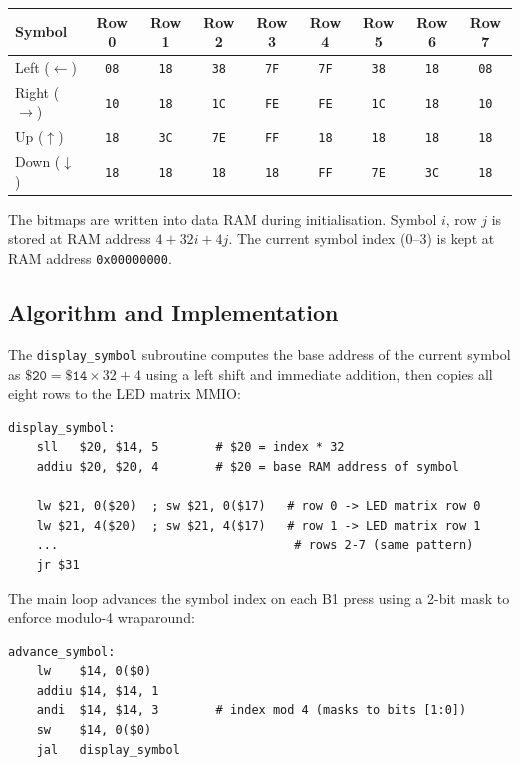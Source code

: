\documentclass[12pt,a4paper]{article}
\begin{document}
\begin{center}
\begin{tabular}{lcccccccc}
\toprule
Symbol & Row 0 & Row 1 & Row 2 & Row 3 & Row 4 & Row 5 & Row 6 & Row 7 \\
\midrule
Left  ($\leftarrow$)  & \texttt{08} & \texttt{18} & \texttt{38} & \texttt{7F} & \texttt{7F} & \texttt{38} & \texttt{18} & \texttt{08} \\
Right ($\rightarrow$) & \texttt{10} & \texttt{18} & \texttt{1C} & \texttt{FE} & \texttt{FE} & \texttt{1C} & \texttt{18} & \texttt{10} \\
Up    ($\uparrow$)    & \texttt{18} & \texttt{3C} & \texttt{7E} & \texttt{FF} & \texttt{18} & \texttt{18} & \texttt{18} & \texttt{18} \\
Down  ($\downarrow$)  & \texttt{18} & \texttt{18} & \texttt{18} & \texttt{18} & \texttt{FF} & \texttt{7E} & \texttt{3C} & \texttt{18} \\
\bottomrule
\end{tabular}
\end{center}

The bitmaps are written into data RAM during initialisation. Symbol $i$, row $j$ is stored at RAM address $4 + 32i + 4j$. The current symbol index (0--3) is kept at RAM address \texttt{0x00000000}.

\subsection{Algorithm and Implementation}
The \texttt{display\_symbol} subroutine computes the base address of the current symbol as $\mathtt{\$20} = \mathtt{\$14} \times 32 + 4$ using a left shift and immediate addition, then copies all eight rows to the LED matrix MMIO:

\begin{lstlisting}[style=mips, caption={Display Subroutine}]
display_symbol:
    sll   $20, $14, 5        # $20 = index * 32
    addiu $20, $20, 4        # $20 = base RAM address of symbol

    lw $21, 0($20)  ; sw $21, 0($17)   # row 0 -> LED matrix row 0
    lw $21, 4($20)  ; sw $21, 4($17)   # row 1 -> LED matrix row 1
    ...                                 # rows 2-7 (same pattern)
    jr $31
\end{lstlisting}

The main loop advances the symbol index on each B1 press using a 2-bit mask to enforce modulo-4 wraparound:

\begin{lstlisting}[style=mips, caption={Symbol Advance Logic}]
advance_symbol:
    lw    $14, 0($0)
    addiu $14, $14, 1
    andi  $14, $14, 3        # index mod 4 (masks to bits [1:0])
    sw    $14, 0($0)
    jal   display_symbol
\end{lstlisting}
\end{document}
